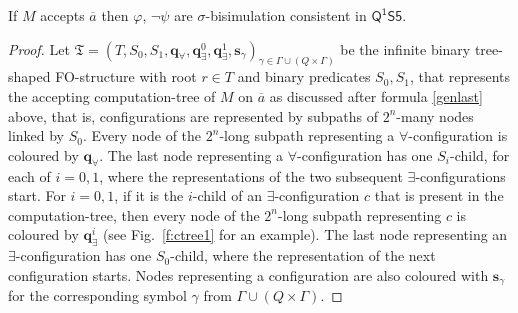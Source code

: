 \documentclass{lmcs} %
\theoremstyle{plain}\newtheorem{satz}[thm]{Satz} %
\newcommand{\FOMS}{\ensuremath{\mathsf{Q^1S5}}}
\newcommand{\fform}[1]{\boldsymbol{#1}}
\newcommand{\qvar}{\fform{q}}
\newcommand{\svar}{\fform{s}}
\newcommand{\inpw}{\overline{a}}
\newcommand{\config}{c}
\newcommand{\qA}{\qvar_\forall}
\newcommand{\qE}{\qvar_\exists}
\newcommand{\treemod}{\mathfrak T}
\newcommand{\treedom}{T}
\newcommand{\treerel}{S}
\begin{document}
	\begin{lem}\label{l:lbsound}
		If $M$ accepts $\inpw$ then $\varphi$, $\neg\psi$ are $\sigma$-bisimulation consistent in $\FOMS$.
	\end{lem}
	\begin{proof}
		Let $\treemod=(\treedom,\treerel_0,\treerel_1,\qA,\qE^0,\qE^1,\svar_\gamma)_{\gamma\in\Gamma\cup(Q\times\Gamma)}$ be the infinite binary tree-shaped FO-structure with root $r\in\treedom$ and binary predicates $\treerel_0,\treerel_1$, that represents the accepting computation-tree of $M$ on $\inpw$ as discussed after formula \eqref{genlast} above, that is, configurations are represented by subpaths of $2^n$-many nodes linked by $\treerel_0$.
		Every node of the $2^n$-long subpath representing a $\forall$-configuration is coloured by $\qA$.
		The last node representing a $\forall$-configuration has one $S_i$-child, for each of $i=0,1$, where the representations of the two subsequent $\exists$-configurations start.
		For $i=0,1$, if it is the $i$-child of an $\exists$-configuration $\config$ that is present in the computation-tree, then
		every node of the $2^n$-long subpath representing $\config$ is coloured by $\qE^i$
		(see Fig.~\ref{f:ctree1} for an example).
		The last node representing an $\exists$-configuration has one $S_0$-child, where the representation of the next configuration starts.
		Nodes representing a configuration are also coloured
		with $\svar_\gamma$ for the corresponding symbol $\gamma$ from 
		$\Gamma\cup(Q\times\Gamma)$.
		

\end{proof}
\end{document}
